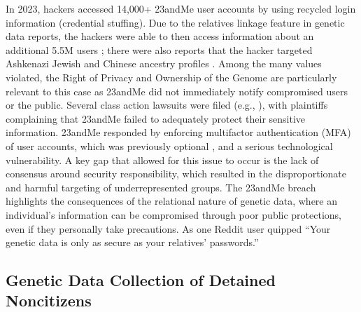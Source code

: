 
In 2023, hackers accessed 14,000+ 23andMe user accounts by using recycled login information (credential stuffing). Due to the relatives linkage feature in genetic data reports, the hackers were able to then access information about an additional 5.5M users \cite{23andme_addressing_2023}; there were also reports that the hacker targeted Ashkenazi Jewish and Chinese ancestry profiles \cite{carballo_23andme_2024}. Among the many values violated, the Right of Privacy and Ownership of the Genome are particularly relevant to this case as 23andMe did not immediately notify compromised users or the public. Several class action lawsuits were filed (e.g., \cite{santana_23andme_2023}), with plaintiffs complaining that 23andMe failed to adequately protect their sensitive information. 23andMe responded by enforcing multifactor authentication (MFA) of user accounts, which was previously optional \cite{whittaker_23andme_2023}, and a serious technological vulnerability. A key gap that allowed for this issue to occur is the lack of consensus around security responsibility, which resulted in the disproportionate and harmful targeting of underrepresented groups. The 23andMe breach highlights the consequences of the relational nature of genetic data, where an individual's information can be compromised through poor public protections, even if they personally take precautions. As one Reddit user quipped ``Your genetic data is only as secure as your relatives' passwords.'' 

\subsection{Genetic Data Collection of Detained Noncitizens}
\label{case:cpt}

